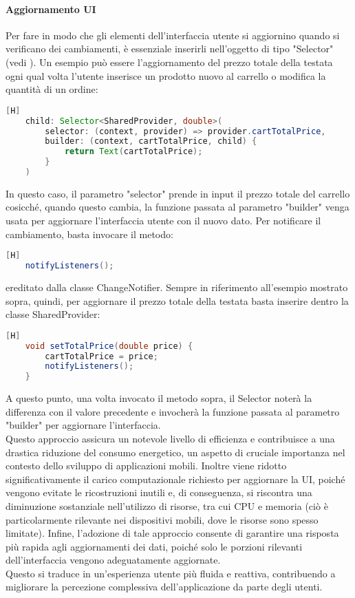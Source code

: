 \noindent
\paragraph{Aggiornamento UI}
Per fare in modo che gli elementi dell'interfaccia utente si aggiornino quando si verificano dei cambiamenti, è essenziale inserirli nell'oggetto di tipo "Selector" (vedi ). Un esempio può essere l'aggiornamento del prezzo totale della testata ogni qual volta l'utente inserisce un prodotto nuovo al carrello o modifica la quantità di un ordine:
\begin{lstlisting}[language=Java, firstnumber=1][H]
	child: Selector<SharedProvider, double>(
		selector: (context, provider) => provider.cartTotalPrice,
		builder: (context, cartTotalPrice, child) {
			return Text(cartTotalPrice);
		}
	)
\end{lstlisting}

\noindent
In questo caso, il parametro "selector" prende in input il prezzo totale del carrello cosicché, quando questo cambia, la funzione passata al parametro "builder" venga usata per aggiornare l'interfaccia utente con il nuovo dato.
Per notificare il cambiamento, basta invocare il metodo:
\begin{lstlisting}[language=Java, firstnumber=1][H]
	notifyListeners();
\end{lstlisting}

\noindent
ereditato dalla classe ChangeNotifier. Sempre in riferimento all'esempio mostrato sopra, quindi, per aggiornare il prezzo totale della testata basta inserire dentro la classe SharedProvider:
\begin{lstlisting}[language=Java, firstnumber=1][H]
	void setTotalPrice(double price) {
		cartTotalPrice = price;
		notifyListeners();
	}
\end{lstlisting}

\noindent
A questo punto, una volta invocato il metodo sopra, il Selector noterà la differenza con il valore precedente e invocherà la funzione passata al parametro "builder" per aggiornare l'interfaccia.\\
Questo approccio assicura un notevole livello di efficienza e contribuisce a una drastica riduzione del consumo energetico, un aspetto di cruciale importanza nel contesto dello sviluppo di applicazioni mobili. Inoltre viene ridotto significativamente il carico computazionale richiesto per aggiornare la UI, poiché vengono evitate le ricostruzioni inutili e, di conseguenza, si riscontra una diminuzione sostanziale nell'utilizzo di risorse, tra cui CPU e memoria (ciò è particolarmente rilevante nei dispositivi mobili, dove le risorse sono spesso limitate). Infine, l'adozione di tale approccio consente di garantire una risposta più rapida agli aggiornamenti dei dati, poiché solo le porzioni rilevanti dell'interfaccia vengono adeguatamente aggiornate.\\ Questo si traduce in un'esperienza utente più fluida e reattiva, contribuendo a migliorare la percezione complessiva dell'applicazione da parte degli utenti.

